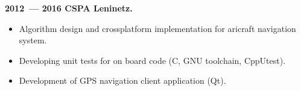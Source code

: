 \documentclass[a4paper,oneside,12pt]{article}
\begin{document}
{\bf
2012~--- 2016 CSPA Leninetz.
}

\begin{itemize}
    \item Algorithm design and crossplatform implementation for aricraft navigation system.
    \item Developing unit tests for on board code (C, GNU toolchain, CppUtest).
    \item Development of GPS navigation client application (Qt). 
\end{itemize}
\end{document}
